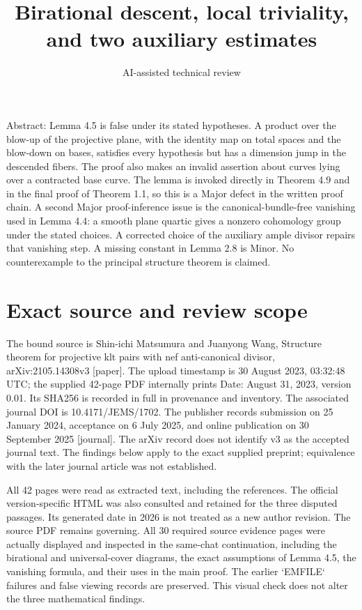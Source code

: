 \documentclass[10pt]{article}
\title{Birational descent, local triviality, and two auxiliary estimates}
\author{AI-assisted technical review}
\date{}
\begin{document}
\maketitle
Abstract: Lemma 4.5 is false under its stated hypotheses. A product over the blow-up of the projective plane, with the identity map on total spaces and the blow-down on bases, satisfies every hypothesis but has a dimension jump in the descended fibers. The proof also makes an invalid assertion about curves lying over a contracted base curve. The lemma is invoked directly in Theorem 4.9 and in the final proof of Theorem 1.1, so this is a Major defect in the written proof chain. A second Major proof-inference issue is the canonical-bundle-free vanishing used in Lemma 4.4: a smooth plane quartic gives a nonzero cohomology group under the stated choices. A corrected choice of the auxiliary ample divisor repairs that vanishing step. A missing constant in Lemma 2.8 is Minor. No counterexample to the principal structure theorem is claimed.\par
\section*{Exact source and review scope}
The bound source is Shin-ichi Matsumura and Juanyong Wang, Structure theorem for projective klt pairs with nef anti-canonical divisor, arXiv:2105.14308v3 [paper]. The upload timestamp is 30 August 2023, 03:32:48 UTC; the supplied 42-page PDF internally prints Date: August 31, 2023, version 0.01. Its SHA256 is recorded in full in provenance and inventory. The associated journal DOI is 10.4171/JEMS/1702. The publisher records submission on 25 January 2024, acceptance on 6 July 2025, and online publication on 30 September 2025 [journal]. The arXiv record does not identify v3 as the accepted journal text. The findings below apply to the exact supplied preprint; equivalence with the later journal article was not established.\par
All 42 pages were read as extracted text, including the references. The official version-specific HTML was also consulted and retained for the three disputed passages. Its generated date in 2026 is not treated as a new author revision. The source PDF remains governing. All 30 required source evidence pages were actually displayed and inspected in the same-chat continuation, including the birational and universal-cover diagrams, the exact assumptions of Lemma 4.5, the vanishing formula, and their uses in the main proof. The earlier `EMFILE` failures and false viewing records are preserved. This visual check does not alter the three mathematical findings.\par
\end{document}

